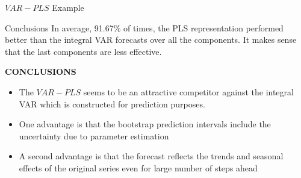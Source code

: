 \documentclass{beamer}
\newcommand{\?}{?`}
\begin{document}
\begin{frame}{$VAR-PLS$ Example}
  \begin{figure}[htbp]
  \end{figure}
\end{frame}


\begin{frame}{Conclusions}
  In average, 91.67\% of times,  the PLS representation performed better than the integral VAR forecasts over all the components.
  It makes sense that the last components are less effective.

  \bigskip

 { \bf{CONCLUSIONS}}
\begin{itemize}
 \item  The  $VAR-PLS$ seems to be an attractive competitor against the integral VAR which is constructed for prediction purposes.
  \item One advantage is that the bootstrap prediction intervals  include the uncertainty due to parameter estimation
  \item A second advantage is that the forecast reflects the trends and seasonal effects of the original series even for large number of steps ahead
  \end{itemize}
\end{frame}
\end{document}
